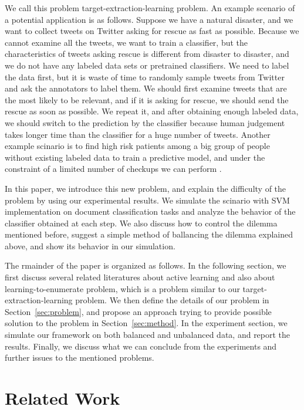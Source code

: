 \documentclass{deime}
\begin{document}
We call this problem target-extraction-learning problem.  An example
scenario of a potential application is as follows.  Suppose we have a
natural disaster, and we want to collect tweets on Twitter asking for
rescue as fast as possible.  Because we cannot examine all the tweets,
we want to train a classifier, but the characteristics of tweets
asking rescue is different from disaster to disaster, and we do not
have any labeled data sets or pretrained classifiers.  We need to
label the data first, but it is waste of time to randomly sample
tweets from Twitter and ask the annotators to label them.  We should
first examine tweets that are the most likely to be relevant, and if
it is asking for rescue, we should send the rescue as soon as
possible.  We repeat it, and after obtaining enough labeled data, we
should switch to the prediction by the classifier because human
judgement takes longer time than the classifier for a huge number of
tweets.  Another example scinario is to find high risk patients among
a big group of people without existing labeled data to train a
predictive model, and under the constraint of a limited number of
checkups we can perform \cite{predictive}.

In this paper, we introduce this new problem, and explain the
difficulty of the problem by using our experimental results.  We
simulate the scinario with SVM implementation on document
classification tasks and analyze the behavior of the classifier
obtained at each step.  We also discuss how to control the
dilemma mentioned before, suggest a simple method of ballancing the
dilemma explained above, and show its behavior in our simulation.

The rmainder of the paper is organized as follows.  In the following
section, we first discuss several related literatures about active
learning and also about learning-to-enumerate problem, which is a
problem similar to our target-extraction-learning problem.  We then
define the details of our problem in Section~\ref{sec:problem}, and
propose an approach trying to provide possible solution to the problem
in Section~\ref{sec:method}.  In the experiment section, we simulate
our framework on both balanced and unbalanced data, and report the
results.  Finally, we discuss what we can conclude from the
experiments and further issues to the mentioned problems.

\section{Related Work}
\label{sec:related}
\end{document}
